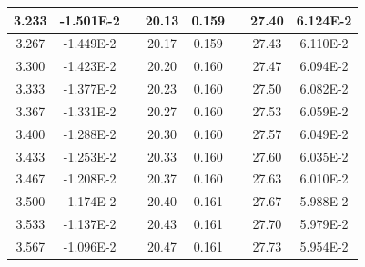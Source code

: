 \documentclass[article,12pt]{elsarticle}
\begin{document}
\begin{longtable}[c]{|c|c|cccccc}
3.233    & -1.501E-2 & \multicolumn{1}{c|}{} & \multicolumn{1}{c|}{20.13}   & \multicolumn{1}{c|}{0.159} & \multicolumn{1}{c|}{} & \multicolumn{1}{c|}{27.40}   & \multicolumn{1}{c|}{6.124E-2} \\ \hline
3.267    & -1.449E-2 & \multicolumn{1}{c|}{} & \multicolumn{1}{c|}{20.17}   & \multicolumn{1}{c|}{0.159} & \multicolumn{1}{c|}{} & \multicolumn{1}{c|}{27.43}   & \multicolumn{1}{c|}{6.110E-2} \\ \hline
3.300    & -1.423E-2 & \multicolumn{1}{c|}{} & \multicolumn{1}{c|}{20.20}   & \multicolumn{1}{c|}{0.160} & \multicolumn{1}{c|}{} & \multicolumn{1}{c|}{27.47}   & \multicolumn{1}{c|}{6.094E-2} \\ \hline
3.333    & -1.377E-2 & \multicolumn{1}{c|}{} & \multicolumn{1}{c|}{20.23}   & \multicolumn{1}{c|}{0.160} & \multicolumn{1}{c|}{} & \multicolumn{1}{c|}{27.50}   & \multicolumn{1}{c|}{6.082E-2} \\ \hline
3.367    & -1.331E-2 & \multicolumn{1}{c|}{} & \multicolumn{1}{c|}{20.27}   & \multicolumn{1}{c|}{0.160} & \multicolumn{1}{c|}{} & \multicolumn{1}{c|}{27.53}   & \multicolumn{1}{c|}{6.059E-2} \\ \hline
3.400    & -1.288E-2 & \multicolumn{1}{c|}{} & \multicolumn{1}{c|}{20.30}   & \multicolumn{1}{c|}{0.160} & \multicolumn{1}{c|}{} & \multicolumn{1}{c|}{27.57}   & \multicolumn{1}{c|}{6.049E-2} \\ \hline
3.433    & -1.253E-2 & \multicolumn{1}{c|}{} & \multicolumn{1}{c|}{20.33}   & \multicolumn{1}{c|}{0.160} & \multicolumn{1}{c|}{} & \multicolumn{1}{c|}{27.60}   & \multicolumn{1}{c|}{6.035E-2} \\ \hline
3.467    & -1.208E-2 & \multicolumn{1}{c|}{} & \multicolumn{1}{c|}{20.37}   & \multicolumn{1}{c|}{0.160} & \multicolumn{1}{c|}{} & \multicolumn{1}{c|}{27.63}   & \multicolumn{1}{c|}{6.010E-2} \\ \hline
3.500    & -1.174E-2 & \multicolumn{1}{c|}{} & \multicolumn{1}{c|}{20.40}   & \multicolumn{1}{c|}{0.161} & \multicolumn{1}{c|}{} & \multicolumn{1}{c|}{27.67}   & \multicolumn{1}{c|}{5.988E-2} \\ \hline
3.533    & -1.137E-2 & \multicolumn{1}{c|}{} & \multicolumn{1}{c|}{20.43}   & \multicolumn{1}{c|}{0.161} & \multicolumn{1}{c|}{} & \multicolumn{1}{c|}{27.70}   & \multicolumn{1}{c|}{5.979E-2} \\ \hline
3.567    & -1.096E-2 & \multicolumn{1}{c|}{} & \multicolumn{1}{c|}{20.47}   & \multicolumn{1}{c|}{0.161} & \multicolumn{1}{c|}{} & \multicolumn{1}{c|}{27.73}   & \multicolumn{1}{c|}{5.954E-2} \\ \hline

\end{longtable}
\end{document}
